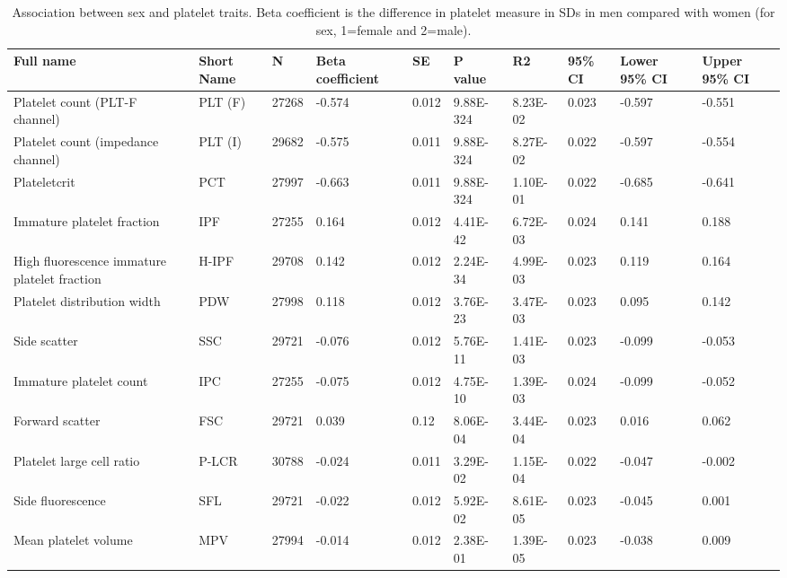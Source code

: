 \documentclass[11pt,twoside]{bristolthesis}
\begin{document}
\begin{landscape}\begin{table}

\caption[Association between sex and platelet traits]{\label{tab:sex-platelets}Association between sex and platelet traits. Beta coefficient is the difference in platelet measure in SDs in men compared with women (for sex, 1=female and 2=male).}
\centering
\begin{tabu} to 
\toprule
Full name & Short Name & N & Βeta coefficient & SE & P value & R2 & 95\% CI & Lower 95\% CI & Upper 95\% CI\\
\midrule
Platelet count (PLT-F channel) & PLT (F) & 27268 & -0.574 & 0.012 & 9.88E-324 & 8.23E-02 & 0.023 & -0.597 & -0.551\\
Platelet count (impedance channel) & PLT (I) & 29682 & -0.575 & 0.011 & 9.88E-324 & 8.27E-02 & 0.022 & -0.597 & -0.554\\
Plateletcrit & PCT & 27997 & -0.663 & 0.011 & 9.88E-324 & 1.10E-01 & 0.022 & -0.685 & -0.641\\
Immature platelet fraction & IPF & 27255 & 0.164 & 0.012 & 4.41E-42 & 6.72E-03 & 0.024 & 0.141 & 0.188\\
High fluorescence immature platelet fraction & H-IPF & 29708 & 0.142 & 0.012 & 2.24E-34 & 4.99E-03 & 0.023 & 0.119 & 0.164\\
\addlinespace
Platelet distribution width & PDW & 27998 & 0.118 & 0.012 & 3.76E-23 & 3.47E-03 & 0.023 & 0.095 & 0.142\\
Side scatter & SSC & 29721 & -0.076 & 0.012 & 5.76E-11 & 1.41E-03 & 0.023 & -0.099 & -0.053\\
Immature platelet count & IPC & 27255 & -0.075 & 0.012 & 4.75E-10 & 1.39E-03 & 0.024 & -0.099 & -0.052\\
Forward scatter & FSC & 29721 & 0.039 & 0.12 & 8.06E-04 & 3.44E-04 & 0.023 & 0.016 & 0.062\\
Platelet large cell ratio & P-LCR & 30788 & -0.024 & 0.011 & 3.29E-02 & 1.15E-04 & 0.022 & -0.047 & -0.002\\
\addlinespace
Side fluorescence & SFL & 29721 & -0.022 & 0.012 & 5.92E-02 & 8.61E-05 & 0.023 & -0.045 & 0.001\\
Mean platelet volume & MPV & 27994 & -0.014 & 0.012 & 2.38E-01 & 1.39E-05 & 0.023 & -0.038 & 0.009\\
\bottomrule
\end{tabu}
\end{table}
\end{landscape}
\end{document}
